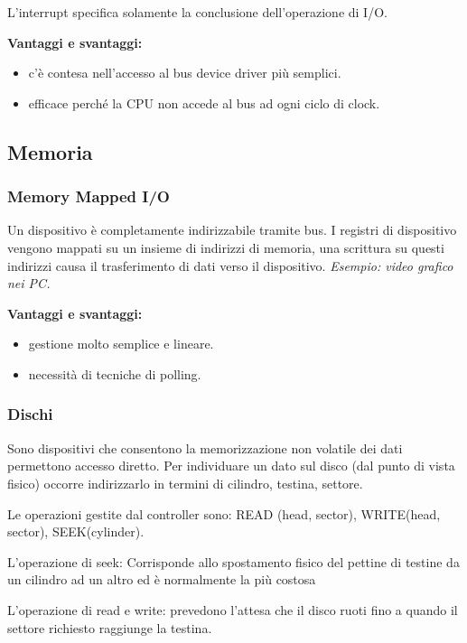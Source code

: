 L'interrupt specifica solamente la conclusione dell'operazione di I/O.
\newline

\textbf{Vantaggi e svantaggi:}
\begin{itemize}
    \item c'è contesa nell'accesso al bus device driver più semplici.
    \item efficace perché la CPU non accede al bus ad ogni ciclo di clock.
\end{itemize}

\subsection{Memoria}
\subsubsection{Memory Mapped I/O}
Un dispositivo è completamente indirizzabile tramite bus.
I registri di dispositivo vengono mappati su un insieme di indirizzi di memoria, una scrittura su questi indirizzi causa il trasferimento di dati verso il dispositivo.
\textit{Esempio: video grafico nei PC.}
\newline

\textbf{Vantaggi e svantaggi:}
\begin{itemize}
    \item gestione molto semplice e lineare.
    \item necessità di tecniche di polling.
\end{itemize}
\subsubsection{Dischi}
Sono dispositivi che consentono la memorizzazione non volatile dei dati permettono accesso diretto. Per individuare un dato sul disco (dal punto di vista fisico) occorre indirizzarlo in termini di cilindro, testina, settore.

Le operazioni gestite dal controller sono: READ (head, sector), WRITE(head, sector), SEEK(cylinder).

L'operazione di seek:
Corrisponde allo spostamento fisico del pettine di testine da
un cilindro ad un altro ed è normalmente la più costosa

L'operazione di read e write:
prevedono l'attesa che il disco ruoti fino a quando il settore richiesto raggiunge la testina.

